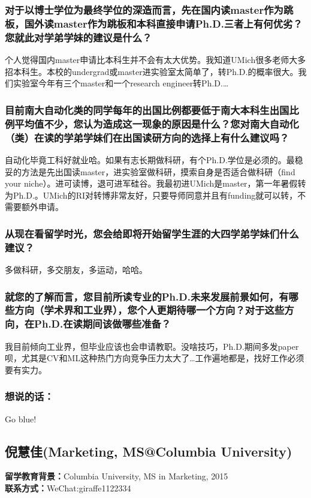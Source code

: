 \documentclass[a4paper,UTF8]{book}
\begin{document}
    \subsubsection*{对于以博士学位为最终学位的深造而言，先在国内读master作为跳板，国外读master作为跳板和本科直接申请Ph.D.三者上有何优劣？您就此对学弟学妹的建议是什么？}
    个人觉得国内master申请比本科生并不会有太大优势。我知道UMich很多老师大多招本科生。本校的undergrad或master进实验室太简单了，转Ph.D.的概率很大。我们实验室今年有三个master和一个research engineer转Ph.D.\dots

    \subsubsection*{目前南大自动化类的同学每年的出国比例都要低于南大本科生出国比例平均值不少，您认为造成这一现象的原因是什么？您对南大自动化（类）在读的学弟学妹们在出国读研方向的选择上有什么建议吗？}
    自动化毕竟工科好就业哈。如果有志长期做科研，有个Ph.D.学位是必须的。最稳妥的方法是先出国读master，进实验室做科研，摸索自身是否适合做科研（find your niche）。进可读博，退可进军硅谷。我最初进UMich是master，第一年暑假转为Ph.D.。UMich的RI对转博非常友好，只要导师同意并且有funding就可以转，不需要额外申请。

    \subsubsection*{从现在看留学时光，您会给即将开始留学生涯的大四学弟学妹们什么建议？}
    多做科研，多交朋友，多运动，哈哈。

    \subsubsection*{就您的了解而言，您目前所读专业的Ph.D.未来发展前景如何，有哪些方向（学术界和工业界），您个人更期待哪一个方向？对于这些方向，在Ph.D.在读期间该做哪些准备？}
    我目前倾向工业界，但毕业应该也会申请教职。没啥技巧，Ph.D.期间多发paper呗，尤其是CV和ML这种热门方向竞争压力太大了\dots 工作遍地都是，找好工作必须要有实力。
    
    \subsubsection{想说的话：}
    Go blue!


\clearpage
\subsection{倪慧佳(Marketing, MS@Columbia University)}
    \textbf{留学教育背景：}Columbia University, MS in Marketing, 2015\\
    \textbf{联系方式：}WeChat:giraffe1122334
\end{document}
